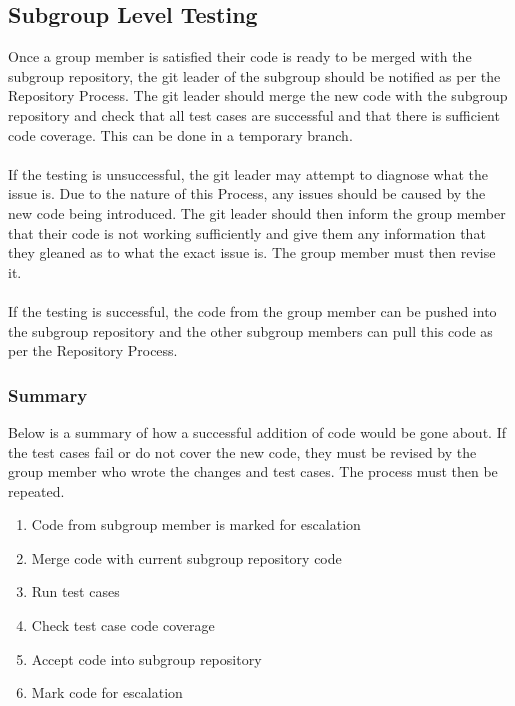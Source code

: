 \documentclass{article}
\begin{document}
\subsection{Subgroup Level Testing}
\label{subgroup}
Once a group member is satisfied their code is ready to be merged with the subgroup repository, the git leader of the subgroup should be notified as per the Repository Process. The git leader should merge the new code with the subgroup repository and check that all test cases are successful and that there is sufficient code coverage. This can be done in a temporary branch.\\
\\
If the testing is unsuccessful, the git leader may attempt to diagnose what the issue is. Due to the nature of this Process, any issues should be caused by the new code being introduced. The git leader should then inform the group member that their code is not working sufficiently and give them any information that they gleaned as to what the exact issue is. The group member must then revise it.\\
\\
If the testing is successful, the code from the group member can be pushed into the subgroup repository and the other subgroup members can pull this code as per the Repository Process.\\

\subsubsection{Summary}
Below is a summary of how a successful addition of code would be gone about. If the test cases fail or do not cover the new code, they must be revised by the group member who wrote the changes and test cases. The process must then be repeated.
\begin{enumerate}
	\item Code from subgroup member is marked for escalation
	\item Merge code with current subgroup repository code
	\item Run test cases
	\item Check test case code coverage
	\item Accept code into subgroup repository
	\item Mark code for escalation
\end{enumerate}
\end{document}
